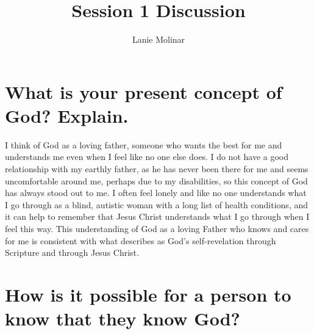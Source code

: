\documentclass[stu,12pt,floatsintext]{apa7}
\title{Session 1 Discussion}
\author{Lanie Molinar}
\begin{document}
\maketitle
\thispagestyle{plain}
\pagestyle{plain}

\section{What is your present concept of God? Explain.}
I think of God as a loving father, someone who wants the best for me and understands me even when I feel like no one else does. I do not have a good relationship with my earthly father, as he has never been there for me and seems uncomfortable around me, perhaps due to my disabilities, so this concept of God has always stood out to me. I often feel lonely and like no one understands what I go through as a blind, autistic woman with a long list of health conditions, and it can help to remember that Jesus Christ understands what I go through when I feel this way. This understanding of God as a loving Father who knows and cares for me is consistent with what \textcite{erickson_introducing_2015} describes as God’s self-revelation through Scripture and through Jesus Christ.
\section{How is it possible for a person to know that they know God?}


\printbibliography
\end{document}
